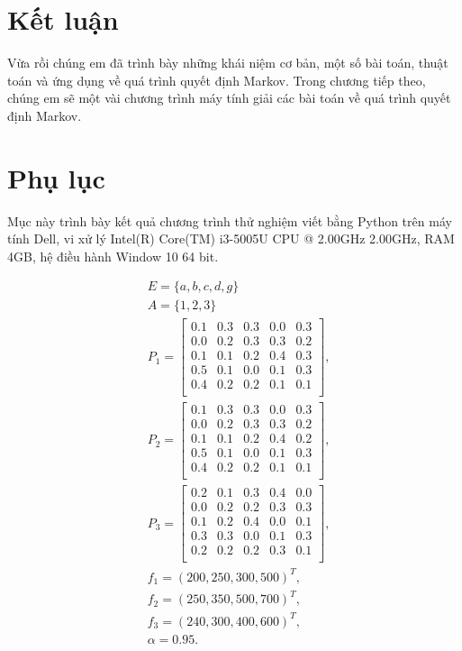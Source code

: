 \documentclass[12pt,a4paper]{report}
\begin{document}
	\chapter{Kết luận}
	\hspace{0.5 cm}
	Vừa rồi chúng em đã trình bày những khái niệm cơ bản, một số bài toán, thuật toán và ứng dụng về quá trình quyết định Markov.
	Trong chương tiếp theo, chúng em sẽ một vài chương trình máy tính giải các bài toán về quá trình quyết định Markov. 
	\chapter{Phụ lục}
	Mục này trình bày kết quả chương trình thử nghiệm viết bằng Python trên máy tính Dell, vi xử lý Intel(R) Core(TM) i3-5005U CPU @ 2.00GHz 2.00GHz, RAM 4GB, hệ điều hành Window 10 64 bit.
	
	\medskip
	\noindent
	\begin{align*}
	&E=\{a,b,c,d,g\}\\
	&A=\{1,2,3\}\\
	&P_1=\left[
	\begin{array}{ccccc}
	0.1&0.3&0.3&0.0&0.3\\
	0.0&0.2&0.3&0.3&0.2\\
	0.1&0.1&0.2&0.4&0.3\\
	0.5&0.1&0.0&0.1&0.3\\
	0.4&0.2&0.2&0.1&0.1\\
	\end{array}
	\right],\\
    &P_2=\left[
	\begin{array}{ccccc}
	0.1&0.3&0.3&0.0&0.3\\
	0.0&0.2&0.3&0.3&0.2\\
	0.1&0.1&0.2&0.4&0.2\\
	0.5&0.1&0.0&0.1&0.3\\
	0.4&0.2&0.2&0.1&0.1\\
	\end{array}
	\right],
	\end{align*}
	\begin{align*}
	 &P_3=\left[
	\begin{array}{ccccc}
		0.2&0.1&0.3&0.4&0.0\\
		0.0&0.2&0.2&0.3&0.3\\
		0.1&0.2&0.4&0.0&0.1\\
		0.3&0.3&0.0&0.1&0.3\\
		0.2&0.2&0.2&0.3&0.1\\
	\end{array}
	\right],\\
	&f_1=(200,250,300,500)^T,\\
	&f_2=(250, 350, 500,700)^T,\\
	&f_3=(240, 300, 400, 600)^T,\\
	& \alpha=0.95.
	\end{align*}
\end{document}
